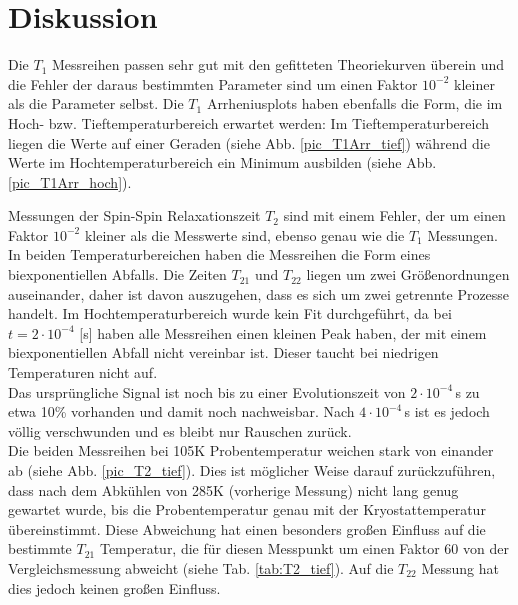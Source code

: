 \section{Diskussion}
Die $T_1$ Messreihen passen sehr gut mit den gefitteten Theoriekurven überein und die Fehler der daraus bestimmten Parameter sind um einen Faktor $10^{-2}$ kleiner als die Parameter selbst.
Die $T_1$ Arrheniusplots haben ebenfalls die Form, die im Hoch- bzw. Tieftemperaturbereich erwartet werden: Im Tieftemperaturbereich liegen die Werte auf einer Geraden (siehe Abb. \ref{pic_T1Arr_tief}) während die Werte im Hochtemperaturbereich ein Minimum ausbilden (siehe Abb. \ref{pic_T1Arr_hoch}).

Messungen der Spin-Spin Relaxationszeit $T_2$ sind mit einem Fehler, der um einen Faktor $10^{-2}$ kleiner als die Messwerte sind, ebenso genau wie die $T_1$ Messungen. In beiden Temperaturbereichen haben die Messreihen die Form eines biexponentiellen Abfalls. Die Zeiten $T_{21}$ und $T_{22}$ liegen um zwei Größenordnungen auseinander, daher ist davon auszugehen, dass es sich um zwei getrennte Prozesse handelt.
Im Hochtemperaturbereich wurde kein Fit durchgeführt, da bei $t = 2\cdot 10^{-4}$ [s] haben alle Messreihen einen kleinen Peak haben, der mit einem biexponentiellen Abfall nicht vereinbar ist. Dieser taucht bei niedrigen Temperaturen nicht auf.\\
Das ursprüngliche Signal ist noch bis zu einer Evolutionszeit von $2\cdot 10^{-4}$\,s zu etwa 10\% vorhanden und damit noch nachweisbar. Nach $4\cdot 10^{-4}$\,s ist es jedoch völlig verschwunden und es bleibt nur Rauschen zurück.\\
Die beiden Messreihen bei 105K Probentemperatur weichen stark von einander ab (siehe Abb. \ref{pic_T2_tief}). Dies ist möglicher Weise darauf zurückzuführen, dass nach dem Abkühlen von 285K (vorherige Messung) nicht lang genug gewartet wurde, bis die Probentemperatur genau mit der Kryostattemperatur übereinstimmt. Diese Abweichung hat einen besonders großen Einfluss auf die bestimmte $T_{21}$ Temperatur, die für diesen Messpunkt um einen Faktor 60 von der Vergleichsmessung abweicht (siehe Tab. \ref{tab:T2_tief}). Auf die $T_22$ Messung hat dies jedoch keinen großen Einfluss.

